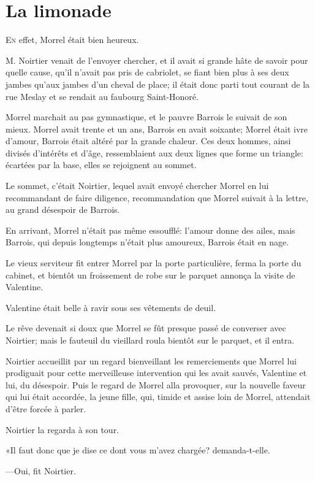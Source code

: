 \chapter{La limonade}

\lettrine{E}{n} effet, Morrel était bien heureux. 

\zz
M. Noirtier venait de l'envoyer chercher, et il avait si grande hâte de savoir pour quelle cause, qu'il n'avait pas pris de cabriolet, se fiant bien plus à ses deux jambes qu'aux jambes d'un cheval de place; il était donc parti tout courant de la rue Meslay et se rendait au faubourg Saint-Honoré. 

Morrel marchait au pas gymnastique, et le pauvre Barrois le suivait de son mieux. Morrel avait trente et un ans, Barrois en avait soixante; Morrel était ivre d'amour, Barrois était altéré par la grande chaleur. Ces deux hommes, ainsi divisés d'intérêts et d'âge, ressemblaient aux deux lignes que forme un triangle: écartées par la base, elles se rejoignent au sommet. 

Le sommet, c'était Noirtier, lequel avait envoyé chercher Morrel en lui recommandant de faire diligence, recommandation que Morrel suivait à la lettre, au grand désespoir de Barrois. 

En arrivant, Morrel n'était pas même essoufflé: l'amour donne des ailes, mais Barrois, qui depuis longtemps n'était plus amoureux, Barrois était en nage. 

Le vieux serviteur fit entrer Morrel par la porte particulière, ferma la porte du cabinet, et bientôt un froissement de robe sur le parquet annonça la visite de Valentine. 

Valentine était belle à ravir sous ses vêtements de deuil. 

Le rêve devenait si doux que Morrel se fût presque passé de converser avec Noirtier; mais le fauteuil du vieillard roula bientôt sur le parquet, et il entra. 

Noirtier accueillit par un regard bienveillant les remerciements que Morrel lui prodiguait pour cette merveilleuse intervention qui les avait sauvés, Valentine et lui, du désespoir. Puis le regard de Morrel alla provoquer, sur la nouvelle faveur qui lui était accordée, la jeune fille, qui, timide et assise loin de Morrel, attendait d'être forcée à parler. 

Noirtier la regarda à son tour. 

«Il faut donc que je dise ce dont vous m'avez chargée? demanda-t-elle. 

—Oui, fit Noirtier.  

